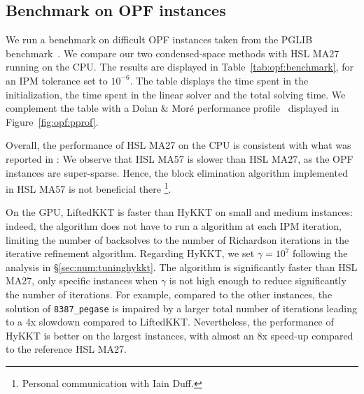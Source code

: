 \subsection{Benchmark on OPF instances}
\label{sec:num:opf}
We run a benchmark on difficult OPF instances taken
from the PGLIB benchmark~\cite{babaeinejadsarookolaee2019power}.
We compare our two condensed-space methods with HSL MA27 running
on the CPU. The results are displayed in Table~\ref{tab:opf:benchmark},
for an IPM tolerance set to $10^{-6}$. The table displays the
time spent in the initialization, the time spent in the linear solver and the total
solving time.
We complement the table with a Dolan \& Moré performance profile~\cite{dolan2002benchmarking} displayed
in Figure~\ref{fig:opf:pprof}.

Overall, the performance of HSL MA27 on the CPU is consistent with what was reported
in \cite{babaeinejadsarookolaee2019power}: We observe that HSL MA57 is slower
than HSL MA27, as the OPF instances are super-sparse.
Hence, the block elimination algorithm implemented in HSL MA57 is not beneficial there
\footnote{Personal communication with Iain Duff.}.

On the GPU, LiftedKKT is faster than HyKKT on small and medium instances: indeed, the algorithm
does not have to run a \CG algorithm at each IPM iteration, limiting the number
of backsolves to the number of Richardson iterations in the iterative refinement
algorithm.
Regarding HyKKT, we set $\gamma = 10^7$ following the analysis in \S\ref{sec:num:tuninghykkt}.
The algorithm is significantly faster than HSL MA27, only specific
instances when $\gamma$ is not high enough to reduce significantly the number
of \CG iterations. For example, compared
to the other instances, the solution of {\tt 8387\_pegase} is impaired
by a larger total number of \CG iterations leading to a 4x slowdown compared to LiftedKKT.
Nevertheless, the performance of HyKKT is better on the largest instances,
with almost an 8x speed-up compared to the reference HSL MA27.

